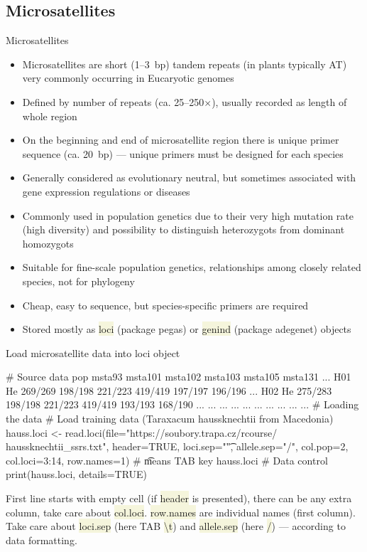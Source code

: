 \documentclass[compress, xelatex, 11pt, xcolor=svgnames, aspectratio=169,
	hyperref={
		bookmarks=true,
		unicode=true,
		colorlinks=true,
		pdftitle={Molecular data in R},
		plainpages=false,
		pdfauthor={Vojtech Zeisek},
		pdfsubject={Course about phylogeny and evolution in R},
		pdfcreator={XeLaTeX},
		pdfkeywords={R, evolution, phylogeny, molecular data},
		linkcolor=Crimson, %
		anchorcolor=Magenta, %
		citecolor=Magenta, %
		filecolor=Magenta, %
		menucolor=Magenta, %
		urlcolor=DodgerBlue, %
		},
	url={hyphens, lowtilde} %
	]{beamer}
\renewcommand{\texttt}[1]{\colorbox{Beige}{{\ttfamily #1}}}
\begin{document}
\subsection{Microsatellites}

\begin{frame}{Microsatellites}
	\begin{itemize}
		\item Microsatellites are short (1--3~bp) tandem repeats (in plants typically AT) very commonly occurring in Eucaryotic genomes
		\item Defined by number of repeats (ca. 25--250$\times$), usually recorded as length of whole region
		\item On the beginning and end of microsatellite region there is unique primer sequence (ca. 20~bp) --- unique primers must be designed for each species
		\item Generally considered as evolutionary neutral, but sometimes associated with gene expression regulations or diseases
		\item Commonly used in population genetics due to their very high mutation rate (high diversity) and possibility to distinguish heterozygots from dominant homozygots
		\item Suitable for fine-scale population genetics, relationships among closely related species, not for phylogeny
		\item Cheap, easy to sequence, but species-specific primers are required
		\item Stored mostly as \texttt{loci} (package pegas) or \texttt{genind} (package adegenet) objects
	\end{itemize}
\end{frame}

\begin{frame}[fragile]{Load microsatellite data into loci object}
	\begin{spluscode}
    # Source data
        pop  msta93 msta101 msta102 msta103 msta105 msta131 ...
    H01  He 269/269 198/198 221/223 419/419 197/197 196/196 ...
    H02  He 275/283 198/198 221/223 419/419 193/193 168/190 ...
    ... ...     ...     ...     ...     ...     ...     ... ...
    # Loading the data
    # Load training data (Taraxacum haussknechtii from Macedonia)
    hauss.loci <- read.loci(file="https://soubory.trapa.cz/rcourse/
      haussknechtii_ssrs.txt", header=TRUE, loci.sep="\t", allele.sep="/",
      col.pop=2, col.loci=3:14, row.names=1) # \t means TAB key
    hauss.loci # Data control
    print(hauss.loci, details=TRUE)
	\end{spluscode}
	\vfill
	\begin{footnotesize}
		First line starts with empty cell (if \texttt{header} is presented), there can be any extra column, take care about \texttt{col.loci}. \texttt{row.names} are individual names (first column). Take care about \texttt{loci.sep} (here TAB \texttt{\textbackslash t}) and \texttt{allele.sep} (here \texttt{/}) --- \alert{according to data formatting}.
	\end{footnotesize}
	\vfill
\end{frame}
\end{document}
